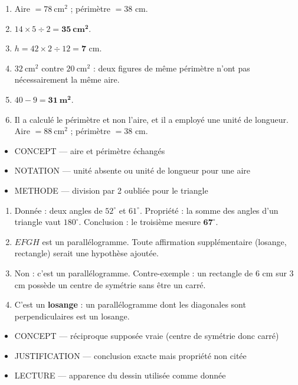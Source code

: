 \documentclass[10pt,a4paper]{article}
\begin{document}
\begin{enumerate}
\item Aire $=78\ \text{cm}^2$ ; périmètre $=38$ cm.
\item $14\times 5\div 2=\mathbf{35\ \text{cm}^2}$.
\item $h = 42\times 2 \div 12 = \mathbf{7}$ cm.
\item $32\ \text{cm}^2$ contre $20\ \text{cm}^2$ : deux figures de même périmètre n'ont pas nécessairement la même aire.
\item $40 - 9 = \mathbf{31\ \text{m}^2}$.
\item Il a calculé le périmètre et non l'aire, et il a employé une unité de longueur. Aire $=88\ \text{cm}^2$ ; périmètre $=38$ cm.
\end{enumerate}
\begin{itemize}
\item \textsc{CONCEPT} --- aire et périmètre échangés
\item \textsc{NOTATION} --- unité absente ou unité de longueur pour une aire
\item \textsc{METHODE} --- division par 2 oubliée pour le triangle
\end{itemize}
\begin{enumerate}
\item Donnée : deux angles de $52^\circ$ et $61^\circ$. Propriété : la somme des angles d'un triangle vaut $180^\circ$. Conclusion : le troisième mesure $\mathbf{67^\circ}$.
\item $EFGH$ est un parallélogramme. Toute affirmation supplémentaire (losange, rectangle) serait une hypothèse ajoutée.
\item Non : c'est un parallélogramme. Contre-exemple : un rectangle de $6$ cm sur $3$ cm possède un centre de symétrie sans être un carré.
\item C'est un \textbf{losange} : un parallélogramme dont les diagonales sont perpendiculaires est un losange.
\end{enumerate}
\begin{itemize}
\item \textsc{CONCEPT} --- réciproque supposée vraie (centre de symétrie donc carré)
\item \textsc{JUSTIFICATION} --- conclusion exacte mais propriété non citée
\item \textsc{LECTURE} --- apparence du dessin utilisée comme donnée
\end{itemize}
\end{document}
